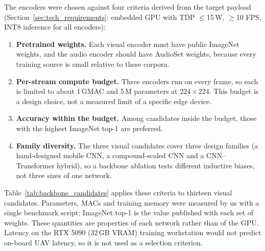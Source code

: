 \documentclass[journal]{IEEEtran}
\begin{document}
The encoders were chosen against four criteria derived from the target payload (Section~\ref{sec:tech_requirements}: embedded GPU with TDP $\leq$15\,W, $\geq$10 FPS, INT8 inference for all encoders):
\begin{enumerate}
    \item \textbf{Pretrained weights.} Each visual encoder must have public ImageNet weights, and the audio encoder should have AudioSet weights, because every training source is small relative to these corpora.
    \item \textbf{Per-stream compute budget.} Three encoders run on every frame, so each is limited to about 1\,GMAC and 5\,M parameters at $224\times224$. This budget is a design choice, not a measured limit of a specific edge device.
    \item \textbf{Accuracy within the budget.} Among candidates inside the budget, those with the highest ImageNet top-1 are preferred.
    \item \textbf{Family diversity.} The three visual candidates cover three design families (a hand-designed mobile CNN, a compound-scaled CNN and a CNN--Transformer hybrid), so a backbone ablation tests different inductive biases, not three sizes of one network.
\end{enumerate}

Table~\ref{tab:backbone_candidates} applies these criteria to thirteen visual candidates. Parameters, MACs and training memory were measured by us with a single benchmark script; ImageNet top-1 is the value published with each set of weights. These quantities are properties of each network rather than of the GPU. Latency on the RTX 5090 (32\,GB VRAM) training workstation would not predict on-board UAV latency, so it is not used as a selection criterion.
\end{document}
